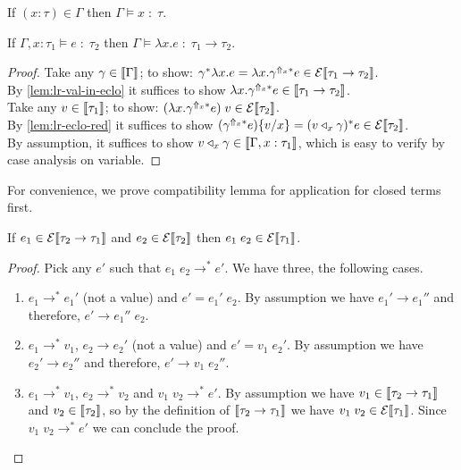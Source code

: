 \begin{lemma}
  If $(x:\tau) \in \Gamma$ then
  $\Gamma \models x \;:\; \tau$.
\end{lemma}

\begin{lemma}
  If $\Gamma, x:\tau_1 \models e \;:\; \tau_2$
  then $\Gamma \models \lambda x.e \;:\; \tau_1 \to \tau_2$.
\end{lemma}
\begin{proof}
  Take any $\gamma \in \llbracket\Gamma\rrbracket$;
    to show: $\gamma^{*}\lambda x.e
      = \lambda x.\gamma^{\Uparrow_x*} e
      \in \mathcal{E}\llbracket\tau_1 \to \tau_2\rrbracket$.\\
  By \autoref{lem:lr-val-in-eclo} it suffices to show 
    $\lambda x.\gamma^{\Uparrow_x*} e
      \in \llbracket\tau_1 \to \tau_2\rrbracket$.\\
  Take any $v \in \llbracket\tau_1\rrbracket$;
    to show: $(\lambda x.\gamma^{\Uparrow_x*} e)\;v
      \in \mathcal{E}\llbracket\tau_2\rrbracket$. \\
  By \autoref{lem:lr-eclo-red} it suffices to show
    $(\gamma^{\Uparrow_x*} e)\{v/x\}
    = (v \triangleleft_x \gamma)^* e \in \mathcal{E}\llbracket\tau_2\rrbracket$. \\
  By assumption, it suffices to show
    $v \triangleleft_x \gamma \in \llbracket\Gamma, x : \tau_1\rrbracket$,
  which is easy to verify by case analysis on variable.
\end{proof}

For convenience, we prove compatibility lemma for application
for closed terms first.

\begin{lemma}\label{lem:lr-compat-app-cl}
  If $e_1 \in \mathcal{E}\llbracket\tau_2 \to \tau_1\rrbracket$
  and $e_2 \in \mathcal{E}\llbracket\tau_2\rrbracket$
  then $e_1\;e_2 \in \mathcal{E}\llbracket\tau_1\rrbracket$.
\end{lemma}
\begin{proof}
  Pick any $e'$ such that $e_1\;e_2 \longrightarrow^* e'$.
  We have three, the following cases.
  \begin{enumerate}[label=(\roman*)]
  \item $e_1 \longrightarrow^* e_1'$ (not a value) and $e' = e_1'\;e_2$.
    By assumption we have $e_1' \longrightarrow e_1''$
    and therefore, $e' \longrightarrow e_1''\;e_2$.
  \item $e_1 \longrightarrow^* v_1$, $e_2\longrightarrow e_2'$
    (not a value) and $e' = v_1\;e_2'$.
    By assumption we have $e_2' \longrightarrow e_2''$
    and therefore, $e' \longrightarrow v_1\;e_2''$.
  \item $e_1 \longrightarrow^* v_1$, $e_2 \longrightarrow^* v_2$
    and $v_1\;v_2 \longrightarrow^* e'$.
    By assumption we have $v_1\in\llbracket\tau_2\to\tau_1\rrbracket$
    and $v_2\in\llbracket\tau_2\rrbracket$,
    so by the definition of $\llbracket\tau_2\to\tau_1\rrbracket$
    we have $v_1\;v_2 \in \mathcal{E}\llbracket\tau_1\rrbracket$.
    Since $v_1\;v_2 \longrightarrow^* e'$ we can conclude the proof.
    \qedhere
  \end{enumerate}
\end{proof}

